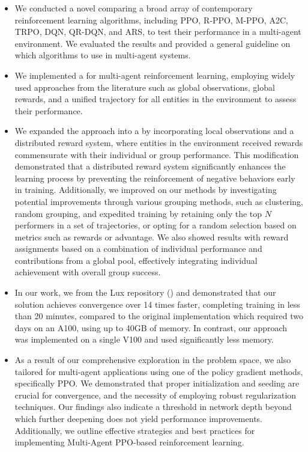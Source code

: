 \begin{itemize}[itemsep=4pt, parsep=0pt]

\item We conducted a novel  comparing a broad array of contemporary reinforcement learning algorithms, including PPO, R-PPO, M-PPO, A2C, TRPO, DQN, QR-DQN, and ARS, to test their performance in a multi-agent environment. We evaluated the results and provided a general guideline on which algorithms to use in multi-agent systems.

\item We implemented a  for multi-agent reinforcement learning, employing widely used approaches from the literature such as global observations, global rewards, and a unified trajectory for all entities in the environment to assess their performance.

\item We expanded the approach into a  by incorporating local observations and a distributed reward system, where entities in the environment received rewards commensurate with their individual or group performance. This modification demonstrated that a distributed reward system significantly enhances the learning process by preventing the reinforcement of negative behaviors early in training. Additionally, we improved on our methods by investigating potential improvements through various grouping methods, such as clustering, random grouping, and expedited training by retaining only the top $N$ performers in a set of trajectories, or opting for a random selection based on metrics such as rewards or advantage. We also showed results with reward assignments based on a combination of individual performance and contributions from a global pool, effectively integrating individual achievement with overall group success. 

\item In our work, we  from the Lux repository (\textcolor{deepblue}{\cite{luxai_s2-baseline-source}}) and demonstrated that our solution achieves convergence over 14 times faster, completing training in less than 20 minutes, compared to the original implementation which required two days on an A100, using up to 40GB of memory. In contrast, our approach was implemented on a single V100 and used significantly less memory.

\item As a result of our comprehensive exploration in the problem space, we also  tailored for multi-agent applications using one of the policy gradient methods, specifically PPO. We demonstrated that proper initialization and seeding are crucial for convergence, and the necessity of employing robust regularization techniques. Our findings also indicate a threshold in network depth beyond which further deepening does not yield performance improvements. Additionally, we outline effective strategies and best practices for implementing Multi-Agent PPO-based reinforcement learning.

\end{itemize}

